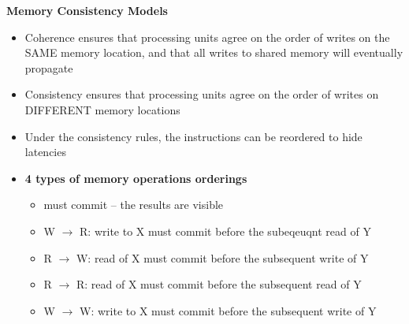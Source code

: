 \documentclass[10pt, landscape]{article}
\begin{document}
\begin{multicols}{4}
\textbf{Memory Consistency Models}
\begin{itemize}
    \item Coherence ensures that processing units agree on the order of writes on the SAME memory location, and that all writes to shared memory will eventually propagate 
    \item Consistency ensures that processing units agree on the order of writes on DIFFERENT memory locations 
    \item Under the consistency rules, the instructions can be reordered to hide latencies
    \item \textbf{4 types of memory operations orderings}
    \begin{itemize}
        \item must commit -- the results are visible
        \item W $\rightarrow$ R: write to X must commit before the subeqeuqnt read of Y
        \item R $\rightarrow$ W: read of X must commit before the subsequent write of Y
        \item R $\rightarrow$ R: read of X must commit before the subsequent read of Y
        \item W $\rightarrow$ W: write to X must commit before the subsequent write of Y
    \end{itemize}
\end{itemize}


\end{multicols}
\end{document}

